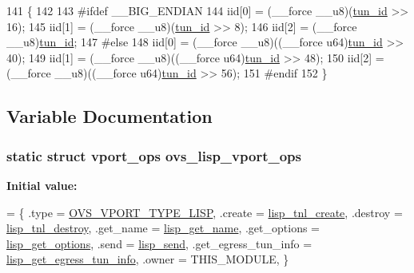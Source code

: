 \begin{DoxyCode}
141 \{
142 
143 \textcolor{preprocessor}{#ifdef \_\_BIG\_ENDIAN}
144     iid[0] = (\_\_force \_\_u8)(\hyperlink{flow_8h_aba5027d7a3d96f0f58dd8e607365934b}{tun\_id} >> 16);
145     iid[1] = (\_\_force \_\_u8)(\hyperlink{flow_8h_aba5027d7a3d96f0f58dd8e607365934b}{tun\_id} >> 8);
146     iid[2] = (\_\_force \_\_u8)\hyperlink{flow_8h_aba5027d7a3d96f0f58dd8e607365934b}{tun\_id};
147 \textcolor{preprocessor}{#else}
148     iid[0] = (\_\_force \_\_u8)((\_\_force u64)\hyperlink{flow_8h_aba5027d7a3d96f0f58dd8e607365934b}{tun\_id} >> 40);
149     iid[1] = (\_\_force \_\_u8)((\_\_force u64)\hyperlink{flow_8h_aba5027d7a3d96f0f58dd8e607365934b}{tun\_id} >> 48);
150     iid[2] = (\_\_force \_\_u8)((\_\_force u64)\hyperlink{flow_8h_aba5027d7a3d96f0f58dd8e607365934b}{tun\_id} >> 56);
151 \textcolor{preprocessor}{#endif}
152 \}
\end{DoxyCode}


\subsection{Variable Documentation}
\hypertarget{linux_2vport-lisp_8c_a758306cfbd9fe092cc094dbf165e5cf7}{}
\subsubsection[{ovs\+\_\+lisp\+\_\+vport\+\_\+ops}]{\setlength{\rightskip}{0pt plus 5cm}static struct {\bf vport\+\_\+ops} ovs\+\_\+lisp\+\_\+vport\+\_\+ops\hspace{0.3cm}{\ttfamily [static]}}\label{linux_2vport-lisp_8c_a758306cfbd9fe092cc094dbf165e5cf7}
{\bfseries Initial value\+:}
\begin{DoxyCode}
= \{
    .type           = \hyperlink{openvswitch_8h_a9a1b861aa99bd83177a2b10b34745b0aa99a33a2b25d9e9de2bdba0544804122e}{OVS\_VPORT\_TYPE\_LISP},
    .create         = \hyperlink{linux_2vport-lisp_8c_aeaf8548971b28354b0c5b67853008ebb}{lisp\_tnl\_create},
    .destroy        = \hyperlink{linux_2vport-lisp_8c_a29757c9680cfc5547ff8b58fc9d39f57}{lisp\_tnl\_destroy},
    .get\_name       = \hyperlink{linux_2vport-lisp_8c_a9b17408cfe8b9c4999729e709eda60c8}{lisp\_get\_name},
    .get\_options        = \hyperlink{linux_2vport-lisp_8c_a54dce33d8291b4f7f816d882b13c3cc3}{lisp\_get\_options},
    .send           = \hyperlink{linux_2vport-lisp_8c_a3a50252974d93009f1c1204799ef7ba0}{lisp\_send},
    .get\_egress\_tun\_info    = \hyperlink{linux_2vport-lisp_8c_a38f0b18b384c833b501a23e942fa2a07}{lisp\_get\_egress\_tun\_info},
    .owner          = THIS\_MODULE,
\}
\end{DoxyCode}
